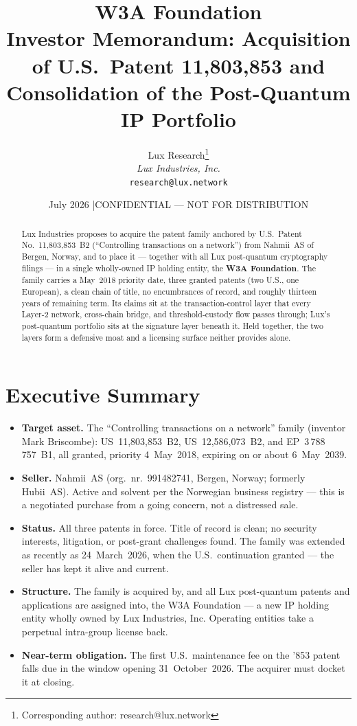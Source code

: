 \documentclass[11pt,a4paper]{article}
\title{W3A Foundation\\[4pt]
\large Investor Memorandum: Acquisition of U.S.\ Patent 11,803,853
and Consolidation of the Post-Quantum IP Portfolio}
\author{
Lux Research\thanks{Corresponding author: research@lux.network}\\
\textit{Lux Industries, Inc.}\\
\texttt{research@lux.network}
}
\date{July 2026 \quad|\quad CONFIDENTIAL --- NOT FOR DISTRIBUTION}
\begin{document}
\luxcoverpage

\begin{abstract}
\noindent Lux Industries proposes to acquire the patent family anchored by
U.S.\ Patent No.\ 11,803,853~B2 (``Controlling transactions on a
network'') from Nahmii~AS of Bergen, Norway, and to place it --- together
with all Lux post-quantum cryptography filings --- in a single
wholly-owned IP holding entity, the \textbf{W3A Foundation}. The family
carries a May~2018 priority date, three granted patents (two U.S., one
European), a clean chain of title, no encumbrances of record, and
roughly thirteen years of remaining term. Its claims sit at the
transaction-control layer that every Layer-2 network, cross-chain
bridge, and threshold-custody flow passes through; Lux's post-quantum
portfolio sits at the signature layer beneath it. Held together, the two
layers form a defensive moat and a licensing surface neither provides
alone.
\end{abstract}

\tableofcontents
\newpage

\section{Executive Summary}

\begin{itemize}[leftmargin=1.4em]
  \item \textbf{Target asset.} The ``Controlling transactions on a
  network'' family (inventor Mark Briscombe): US~11,803,853~B2,
  US~12,586,073~B2, and EP~3\,788\,757~B1, all granted, priority
  4~May~2018, expiring on or about 6~May~2039.
  \item \textbf{Seller.} Nahmii~AS (org.\ nr.\ 991482741, Bergen,
  Norway; formerly Hubii~AS). Active and solvent per the Norwegian
  business registry --- this is a negotiated purchase from a going
  concern, not a distressed sale.
  \item \textbf{Status.} All three patents in force. Title of record is
  clean; no security interests, litigation, or post-grant challenges
  found. The family was extended as recently as 24~March~2026, when the
  U.S.\ continuation granted --- the seller has kept it alive and
  current.
  \item \textbf{Structure.} The family is acquired by, and all Lux
  post-quantum patents and applications are assigned into, the W3A
  Foundation --- a new IP holding entity wholly owned by Lux
  Industries, Inc. Operating entities take a perpetual intra-group
  license back.
  \item \textbf{Near-term obligation.} The first U.S.\ maintenance fee
  on the '853 patent falls due in the window opening 31~October~2026.
  The acquirer must docket it at closing.
\end{itemize}
\end{document}
